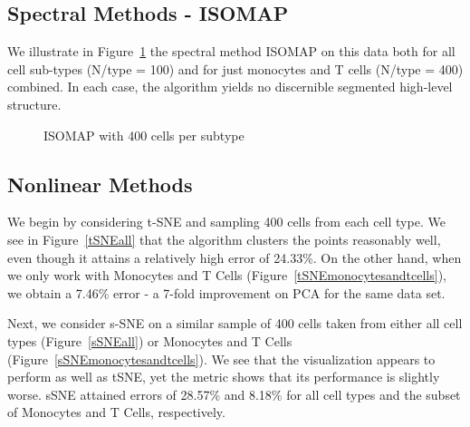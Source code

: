 \documentclass{article}
\begin{document}
\subsection{Spectral Methods - ISOMAP}
We illustrate in Figure~\ref{isomaps} the spectral method ISOMAP on this data both for all cell sub-types (N/type = 100) and for just monocytes and T cells (N/type = 400) combined. In each case, the algorithm yields no discernible segmented high-level structure.

\begin{figure}[h]
\vskip 0.2in
\begin{center}
\quad
{}\quad
\end{center}
\caption{ISOMAP with 400 cells per subtype}
\label{isomaps}
\vskip -0.2in
\end{figure}

\subsection{Nonlinear Methods}
We begin by considering t-SNE and sampling 400 cells from each cell type. We see in Figure~\ref{tSNEall} that the algorithm clusters the points reasonably well, even though it attains a relatively high error of 24.33\%. On the other hand, when we only work with Monocytes and T Cells (Figure~\ref{tSNEmonocytesandtcells}), we obtain a 7.46\% error - a 7-fold improvement on PCA for the same data set. 

Next, we consider s-SNE on a similar sample of 400 cells taken from either all cell types (Figure~\ref{sSNEall})  or  Monocytes and T Cells (Figure~\ref{sSNEmonocytesandtcells}). We see that the visualization appears to perform as well as tSNE, yet the metric shows that its performance is slightly worse. sSNE attained errors of 28.57\% and 8.18\% for all cell types and the subset of Monocytes and T Cells, respectively.  
\end{document}
